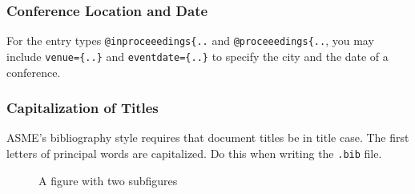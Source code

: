 \documentclass[varvw,largesc,upint,mathalfa=cal=euler,hyphenate,balance,lang-second=french,lang=english,colorlinks]{asmeconf} %
\begin{document}
\subsubsection*{Conference Location and Date} For the entry types \verb|@inproceeedings{..| and \verb|@proceeedings{..|, you may include \verb|venue={..}| and \verb|eventdate={..}| to specify the city and the date of a conference.

\subsubsection*{Capitalization of Titles} ASME's bibliography style requires that document titles be in title case. The first letters of principal words are capitalized. Do this when writing the \texttt{.bib} file.




\begin{figure}
\begin{subfigure}[t]{0.5\textwidth} %
\vbox{
\vspace*{1.7em}
\vspace*{1.7em}
}
\end{subfigure}%
\begin{subfigure}[t]{0.5\textwidth}
\end{subfigure}
\caption{A figure with two subfigures  \cite{Lienhard2019b}}\label{fig:2}
\end{figure}
\end{document}
